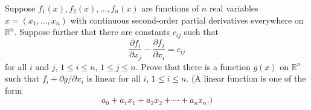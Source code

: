 Suppose $f_1(x), f_2(x), \dots, f_n(x)$ are functions of $n$ real
variables $x = (x_1, \dots, x_n)$ with continuous second-order partial
derivatives everywhere on $\mathbb{R}^n$. Suppose further that there are
constants $c_{ij}$ such that
\[
\frac{\partial f_i}{\partial x_j} - \frac{\partial f_j}{\partial x_i}
= c_{ij}
\]
for all $i$ and $j$, $1\leq i \leq n$, $1 \leq j \leq n$. Prove that
there is a function $g(x)$ on $\mathbb{R}^n$ such that $f_i + \partial
g/\partial x_i$ is linear for all $i$, $1 \leq i \leq n$. (A linear
function is one of the form
\[
a_0 + a_1 x_1 + a_2 x_2 + \cdots + a_n x_n.)
\]
